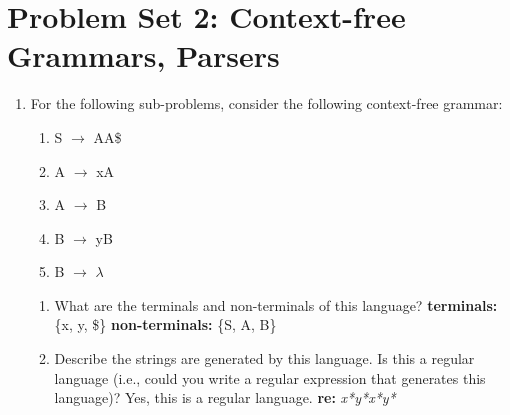 \documentclass{article}
\begin{document}
\section*{Problem Set 2: Context-free Grammars, Parsers}
\begin{enumerate}
  \setlength\itemsep{-.25em}
  \item For the following sub-problems, consider the following context-free grammar:
  \begin{enumerate}
    \setlength\itemsep{-.25em}
    \renewcommand{\labelenumii}{\arabic{enumii}.}
    \item S $\rightarrow$ AA\$
    \item A $\rightarrow$ xA
    \item A $\rightarrow$ B
    \item B $\rightarrow$ yB
    \item B $\rightarrow$ $\lambda$
  \end{enumerate}
  \begin{enumerate}
    \setlength\itemsep{-.25em}
    \item What are the terminals and non-terminals of this language?\newline\newline
    \textbf{terminals:} \{x, y, \$\} \newline
    \textbf{non-terminals:} \{S, A, B\} \newline

    \item Describe the strings are generated by this language. Is this a regular language\newline
    	(i.e., could you write a regular expression that generates this language)?\newline\newline
    Yes, this is a regular language. \textbf{re:} \textit{x*y*x*y*}\newline
    	

\end{enumerate}
\end{enumerate}
\end{document}
